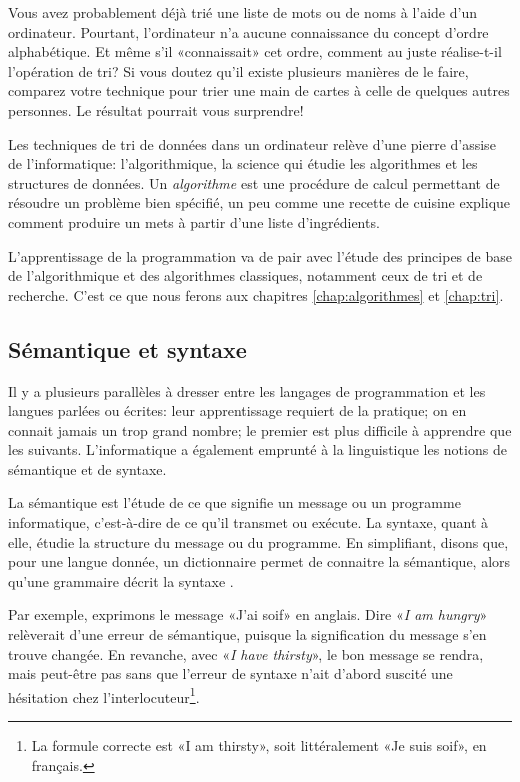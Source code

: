 Vous avez probablement déjà trié une liste de mots ou de noms à l'aide
d'un ordinateur. Pourtant, l'ordinateur n'a aucune connaissance du
concept d'ordre alphabétique. Et même s'il «connaissait» cet ordre,
comment au juste réalise-t-il l'opération de tri? Si vous doutez qu'il
existe plusieurs manières de le faire, comparez votre technique pour
trier une main de cartes à celle de quelques autres personnes. Le
résultat pourrait vous surprendre!

Les techniques de tri de données dans un ordinateur relève d'une
pierre d'assise de l'informatique:
l'algorithmique, la science qui étudie les
algorithmes et les structures de données. Un
\emph{algorithme} est une procédure de calcul
permettant de résoudre un problème bien spécifié, un peu comme une
recette de cuisine explique comment produire un mets à partir d'une
liste d'ingrédients.

L'apprentissage de la programmation va de pair avec l'étude des
principes de base de l'algorithmique et des algorithmes classiques,
notamment ceux de tri et de recherche. C'est ce que nous ferons aux
chapitres \ref{chap:algorithmes} et \ref{chap:tri}.

\subsection{Sémantique et syntaxe}
\label{sec:informatique:concepts:semantique}

Il y a plusieurs parallèles à dresser entre les langages de
programmation et les langues parlées ou écrites: leur apprentissage
requiert de la pratique; on en connait jamais un trop grand nombre; le
premier est plus difficile à apprendre que les suivants.
L'informatique a également emprunté à la linguistique les notions de
sémantique et de syntaxe.

La sémantique est l'étude de ce que signifie un message ou un
programme informatique, c'est-à-dire de ce qu'il transmet ou exécute.
La syntaxe, quant à elle, étudie la structure du message ou du
programme. En simplifiant, disons que, pour une langue donnée, un
dictionnaire permet de connaitre la sémantique, alors qu'une grammaire
décrit la syntaxe \citep{Hebenstreit:semantique}.

Par exemple, exprimons le message «J'ai soif» en anglais. Dire
«\emph{I am hungry}» relèverait d'une erreur de sémantique, puisque la
signification du message s'en trouve changée. En revanche, avec
«\emph{I have thirsty}», le bon message se rendra, mais peut-être pas
sans que l'erreur de syntaxe n'ait d'abord suscité une hésitation chez
l'interlocuteur\footnote{%
  La formule correcte est «I am thirsty», soit littéralement «Je suis
  soif», en français.}.

